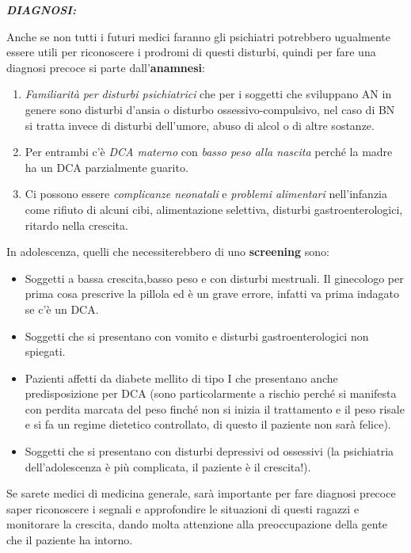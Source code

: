 \documentclass[]{article}
\begin{document}
\textbf{\emph{DIAGNOSI:}}

Anche se non tutti i futuri medici faranno gli psichiatri potrebbero
ugualmente essere utili per riconoscere i prodromi di questi disturbi,
quindi per fare una diagnosi precoce si parte dall'\textbf{anamnesi}:

\begin{enumerate}
\def\labelenumi{\arabic{enumi}.}
\item
  \emph{Familiarità per disturbi psichiatrici} che per i soggetti che
  sviluppano AN in genere sono disturbi d'ansia o disturbo
  ossessivo-compulsivo, nel caso di BN si tratta invece di disturbi
  dell'umore, abuso di alcol o di altre sostanze.
\item
  Per entrambi c'è \emph{DCA materno} con \emph{basso peso alla nascita}
  perché la madre ha un DCA parzialmente guarito.
\item
  Ci possono essere \emph{complicanze neonatali} e \emph{problemi
  alimentari} nell'infanzia come rifiuto di alcuni cibi, alimentazione
  selettiva, disturbi gastroenterologici, ritardo nella crescita.
\end{enumerate}

In adolescenza, quelli che necessiterebbero di uno \textbf{screening}
sono:

\begin{itemize}
\item
  Soggetti a bassa crescita,basso peso e con disturbi mestruali. Il
  ginecologo per prima cosa prescrive la pillola ed è un grave errore,
  infatti va prima indagato se c'è un DCA.
\item
  Soggetti che si presentano con vomito e disturbi gastroenterologici
  non spiegati.
\item
  Pazienti affetti da diabete mellito di tipo I che presentano anche
  predisposizione per DCA (sono particolarmente a rischio perché si
  manifesta con perdita marcata del peso finché non si inizia il
  trattamento e il peso risale e si fa un regime dietetico controllato,
  di questo il paziente non sarà felice).
\item
  Soggetti che si presentano con disturbi depressivi od ossessivi (la
  psichiatria dell'adolescenza è più complicata, il paziente è il
  crescita!).
\end{itemize}

Se sarete medici di medicina generale, sarà importante per fare diagnosi
precoce saper riconoscere i segnali e approfondire le situazioni di
questi ragazzi e monitorare la crescita, dando molta attenzione alla
preoccupazione della gente che il paziente ha intorno.
\end{document}

